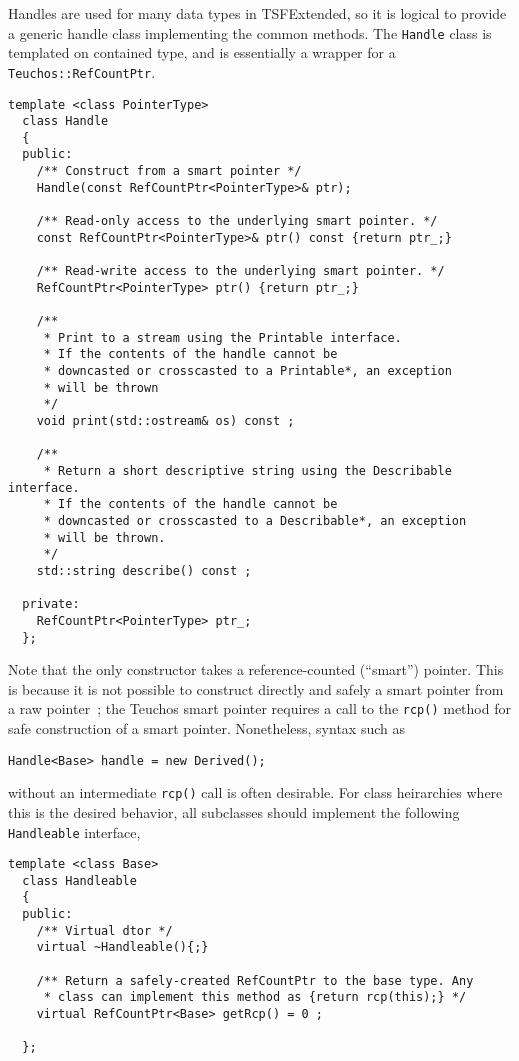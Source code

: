 Handles are used for many data types in TSFExtended, so it is logical to
provide a generic handle class implementing the common methods. The
{\tt Handle} class is templated on contained type, and is essentially
a wrapper for a {\tt Teuchos::RefCountPtr}. 
{\scriptsize\begin{verbatim}
template <class PointerType>
  class Handle
  {
  public:
    /** Construct from a smart pointer */
    Handle(const RefCountPtr<PointerType>& ptr);

    /** Read-only access to the underlying smart pointer. */
    const RefCountPtr<PointerType>& ptr() const {return ptr_;}

    /** Read-write access to the underlying smart pointer. */
    RefCountPtr<PointerType> ptr() {return ptr_;}

    /** 
     * Print to a stream using the Printable interface. 
     * If the contents of the handle cannot be 
     * downcasted or crosscasted to a Printable*, an exception
     * will be thrown 
     */
    void print(std::ostream& os) const ;

    /** 
     * Return a short descriptive string using the Describable interface.
     * If the contents of the handle cannot be 
     * downcasted or crosscasted to a Describable*, an exception
     * will be thrown. 
     */
    std::string describe() const ;

  private:
    RefCountPtr<PointerType> ptr_;
  };
\end{verbatim}}
Note that the only constructor takes a reference-counted (``smart'')
pointer. This is because it is not possible to construct directly and safely
a smart pointer from a raw pointer~\cite{ref:SmartPtrs}; the Teuchos
smart pointer requires a call to the {\tt rcp()} method for safe
construction of a smart pointer. Nonetheless,
syntax such as 
{\scriptsize\begin{verbatim}
Handle<Base> handle = new Derived();
\end{verbatim}}
without an intermediate {\tt rcp()} call is often desirable. For class
heirarchies where this is the desired behavior, all subclasses
should implement the following {\tt Handleable} interface,
{\scriptsize\begin{verbatim}
template <class Base>
  class Handleable
  {
  public:
    /** Virtual dtor */
    virtual ~Handleable(){;}

    /** Return a safely-created RefCountPtr to the base type. Any
     * class can implement this method as {return rcp(this);} */
    virtual RefCountPtr<Base> getRcp() = 0 ;
    
  };
\end{verbatim}}
